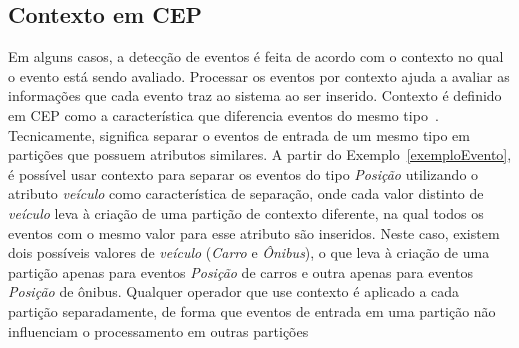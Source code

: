 \subsection{Contexto em CEP}
\label{sec:CEPcontext}


Em alguns casos, a detecção de eventos é feita de acordo com o contexto no qual o evento está sendo avaliado. Processar os eventos por contexto ajuda a avaliar as informações que cada evento traz ao sistema ao ser inserido. Contexto é definido em CEP como a característica que diferencia eventos do mesmo tipo~\citep{Etzion:2010:EPA:1894960}. Tecnicamente, significa separar o eventos de entrada de um mesmo tipo em partições que possuem atributos similares.   %
A partir do Exemplo~\ref{exemploEvento}, é possível usar contexto para separar os eventos do tipo \textit{Posição} utilizando o atributo \textit{veículo} como característica de separação, onde cada valor distinto de \textit{veículo} leva à criação de uma partição de contexto diferente, na qual todos os eventos com o mesmo valor para esse atributo são inseridos. Neste caso, existem dois possíveis valores de \textit{veículo} (\textit{Carro} e \textit{Ônibus}), o que leva à criação de uma partição apenas para eventos \textit{Posição} de carros e outra apenas para eventos \textit{Posição} de ônibus.  Qualquer operador que use contexto é aplicado a cada partição separadamente, de forma que eventos de entrada em uma partição não influenciam o processamento em outras partições%

